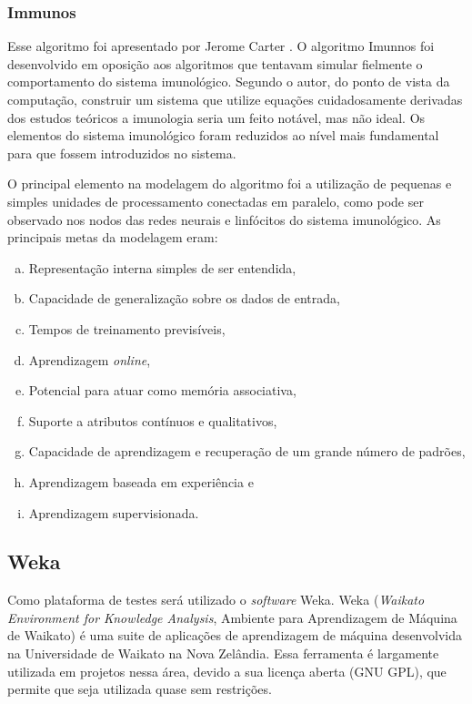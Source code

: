 \subsubsection{Immunos}
\label{sec:prop_immunos}

Esse algoritmo foi apresentado por Jerome Carter \cite{Carter2000}. O algoritmo Imunnos foi desenvolvido em oposição aos algoritmos que tentavam simular fielmente o comportamento do sistema imunológico. Segundo o autor, do ponto de vista da computação, construir um sistema que utilize equações cuidadosamente derivadas dos estudos teóricos a imunologia seria um feito notável, mas não ideal. Os elementos do sistema imunológico foram reduzidos ao nível mais fundamental para que fossem introduzidos no sistema.

O principal elemento na modelagem do algoritmo foi a utilização de pequenas e simples unidades de processamento conectadas em paralelo, como pode ser observado nos nodos das redes neurais e linfócitos do sistema imunológico. As principais metas da modelagem eram:

\vspace{2mm}
\begin{enumerate}[a)]
    \itemsep1pt
    \item Representação interna simples de ser entendida,
    \item Capacidade de generalização sobre os dados de entrada,
    \item Tempos de treinamento previsíveis,
    \item Aprendizagem \emph{online},
    \item Potencial para atuar como memória associativa,
    \item Suporte a atributos contínuos e qualitativos,
    \item Capacidade de aprendizagem e recuperação de um grande número de padrões,
    \item Aprendizagem baseada em experiência e
    \item Aprendizagem supervisionada.
\end{enumerate}
\vspace{2mm}

\subsection{Weka}{}
\label{sec:prop_weka}

Como plataforma de testes será utilizado o \emph{software} Weka. Weka (\emph{Waikato Environment for Knowledge Analysis}, Ambiente para Aprendizagem de Máquina de Waikato) é uma suite de aplicações de aprendizagem de máquina desenvolvida na Universidade de Waikato na Nova Zelândia. Essa ferramenta é largamente utilizada em projetos nessa área, devido a sua licença aberta (GNU GPL), que permite que seja utilizada quase sem restrições.

